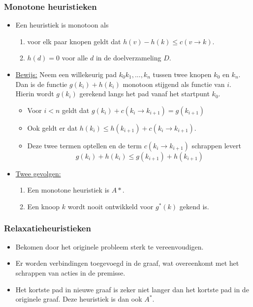 \subsubsection{Monotone heuristieken}
\begin{itemize}
	\item Een heuristiek is monotoon als 
	\begin{enumerate}
		\item voor elk paar knopen geldt dat $h(v) - h(k) \leq c(v \rightarrow k)$.
		\item $h(d) = 0$ voor alle $d$ in de doelverzameling $D$.
	\end{enumerate}
	\item \underline{Bewijs:} Neem een willekeurig pad $k_0k_1, ...,k_n$ tussen twee knopen $k_0$ en $k_n$. Dan is de functie $g(k_i) + h(k_i)$ monotoon stijgend als functie van $i$. Hierin wordt $g(k_i)$ gerekend langs het pad vanaf het startpunt $k_0$.
	\begin{itemize}
		\item Voor $i < n$ geldt dat $g(k_i) + c(k_i \rightarrow k_{i + 1}) = g(k_{i + 1})$
		\item Ook geldt er dat $h(k_i) \leq h(k_{i + 1}) + c(k_i \rightarrow k_{i + 1})$.
		\item Deze twee termen optellen en de term $c(k_i \rightarrow k_{i + 1})$ schrappen levert 
		$$g(k_i) + h(k_i) \leq g(k_{i + 1}) + h(k_{i + 1})$$
	\end{itemize}
	\item \underline{Twee gevolgen:}
	\begin{enumerate}
		\item Een monotone heuristiek is $A*$.
		\item Een knoop $k$ wordt nooit ontwikkeld voor $g^*(k)$ gekend is.
	\end{enumerate}
\end{itemize}

\subsubsection{Relaxatieheuristieken}
\begin{itemize}
	\item Bekomen door het originele probleem sterk te vereenvoudigen.
	\item Er worden verbindingen toegevoegd in de graaf, wat overeenkomt met het schrappen van acties in de premisse.
	\item Het kortste pad in nieuwe graaf is zeker niet langer dan het kortste pad in de originele graaf. Deze heuristiek is dan ook $A^*$.
\end{itemize}

